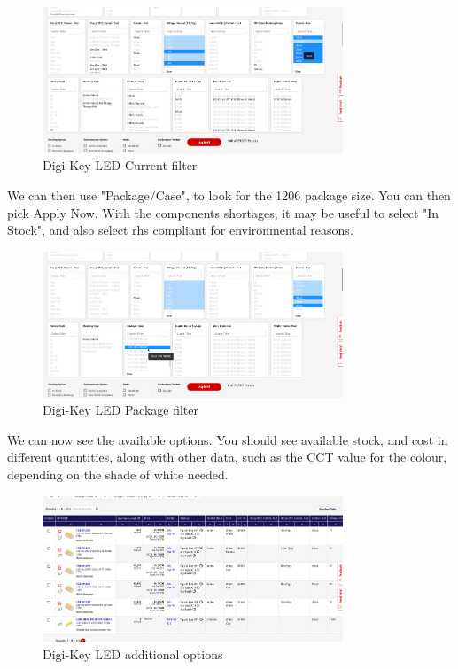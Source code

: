 \documentclass[a4paper,11pt]{report}
\begin{document}
\begin{figure}[H]
\centering
\includegraphics[width=0.8\textwidth]{screenshots/DigiKeyWhiteLEDPageCurrent}
\caption{Digi-Key LED Current filter}
\end{figure}

We can then use "Package/Case", to look for the 1206 package size. You can then pick Apply Now. With the components shortages, it may be useful to select "In Stock", and also select \gls{rhs} compliant for environmental reasons.


\begin{figure}[H]
\centering
\includegraphics[width=0.8\textwidth]{screenshots/DigiKeyWhiteLEDPagePackage}
\caption{Digi-Key LED Package filter}
\end{figure}

We can now see the available options. You should see available stock, and cost in different quantities, along with other data, such as the CCT value for the colour, depending on the shade of white needed.


\begin{figure}[H]
\centering
\includegraphics[width=0.8\textwidth]{screenshots/DigiKeyWhiteLEDPageOptions}
\caption{Digi-Key LED additional options}
\end{figure}
\end{document}

